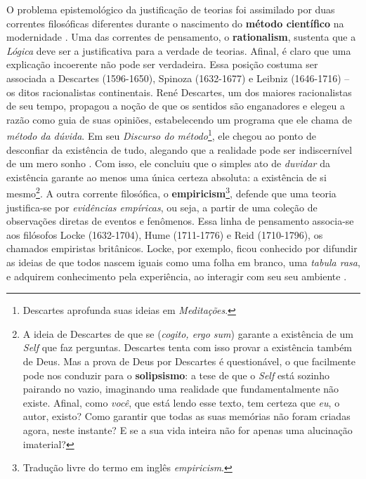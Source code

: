 \documentclass[./main.tex]{subfiles}
\begin{document}
\par O problema epistemológico da justificação de teorias foi assimilado por duas correntes filosóficas diferentes durante o nascimento do \textbf{método científico} na modernidade \cite{sep-rationalism-empiricism}. Uma das correntes de pensamento, o \textbf{\gls{rationalism}}, sustenta que a \textit{Lógica} deve ser a justificativa para a verdade de teorias. Afinal, é claro que uma explicação incoerente não pode ser verdadeira. Essa posição costuma ser associada a Descartes (1596-1650), Spinoza (1632-1677) e Leibniz (1646-1716) -- os ditos racionalistas continentais. René Descartes, um dos maiores racionalistas de seu tempo, propagou a noção de que os sentidos são enganadores e elegeu a razão como guia de suas opiniões, estabelecendo um programa que ele chama de \textit{método da dúvida}. Em seu \textit{Discurso do método}\footnote{Descartes aprofunda suas ideias em \textit{Meditações}.}, ele chegou ao ponto de desconfiar da existência de tudo, alegando que a realidade pode ser indiscernível de um mero sonho \cite{descartes2008discurso}. Com isso, ele concluiu que o simples ato de \textit{duvidar} da existência garante ao menos uma única certeza absoluta: a existência de si mesmo\footnote{A ideia de Descartes de que se  (\textit{cogito, ergo sum}) garante a existência de um \textit{Self} que faz perguntas. Descartes tenta com isso provar a existência também de Deus. Mas a prova de Deus por Descartes é questionável, o que facilmente pode nos conduzir para o \textbf{solipsismo}: a tese de que o \textit{Self} está sozinho pairando no vazio, imaginando uma realidade que fundamentalmente não existe. Afinal, como \textit{você}, que está lendo esse texto, tem certeza que \textit{eu}, o autor, existo? Como garantir que todas as suas memórias não foram criadas agora, neste instante?  E se a sua vida inteira não for apenas uma alucinação imaterial?}. A outra corrente filosófica, o \textbf{\gls{empiricism}}\footnote{Tradução livre do termo em inglês \textit{empiricism}.}, defende que uma \gls{teoria} justifica-se por \textit{evidências empíricas}, ou seja, a partir de uma coleção de observações diretas de eventos e fenômenos. Essa linha de pensamento associa-se aos filósofos Locke (1632-1704), Hume (1711-1776) e Reid (1710-1796), os chamados empiristas britânicos. Locke, por exemplo, ficou conhecido por difundir as ideias de que todos nascem iguais como uma folha em branco, uma \textit{tabula rasa}, e adquirem conhecimento pela experiência, ao interagir com seu seu ambiente \cite{sep-locke}. 
\end{document}

